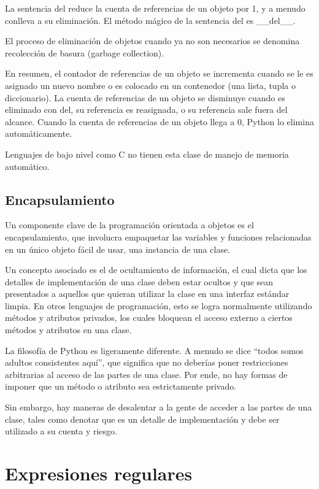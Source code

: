 \documentclass{report}
\begin{document}
La sentencia del reduce la cuenta de referencias de un objeto por 1, y a menudo conlleva a su eliminación. El método mágico de la sentencia del es \_\_del\_\_.

El proceso de eliminación de objetos cuando ya no son necesarios se denomina recolección de basura (garbage collection).

En resumen, el contador de referencias de un objeto se incrementa cuando se le es asignado un nuevo nombre o es colocado en un contenedor (una lista, tupla o diccionario). La cuenta de referencias de un objeto se disminuye cuando es eliminado con del, su referencia es reasignada, o su referencia sale fuera del alcance. Cuando la cuenta de referencias de un objeto llega a 0, Python lo elimina automáticamente.


Lenguajes de bajo nivel como C no tienen esta clase de manejo de memoria automático.

\section{Encapsulamiento}

Un componente clave de la programación orientada a objetos es el encapsulamiento, que involucra empaquetar las variables y funciones relacionadas en un único objeto fácil de usar, una instancia de una clase.

Un concepto asociado es el de ocultamiento de información, el cual dicta que los detalles de implementación de una clase deben estar ocultos y que sean presentados a aquellos que quieran utilizar la clase en una interfaz estándar limpia. En otros lenguajes de programación, esto se logra normalmente utilizando métodos y atributos privados, los cuales bloquean el acceso externo a ciertos métodos y atributos en una clase.

La filosofía de Python es ligeramente diferente. A menudo se dice “todos somos adultos consistentes aquí”, que significa que no deberías poner restricciones arbitrarias al acceso de las partes de una clase. Por ende, no hay formas de imponer que un método o atributo sea estrictamente privado.

Sin embargo, hay maneras de desalentar a la gente de acceder a las partes de una clase, tales como denotar que es un detalle de implementación y debe ser utilizado a su cuenta y riesgo.


\clearpage\chapter{Expresiones regulares}
\end{document}
